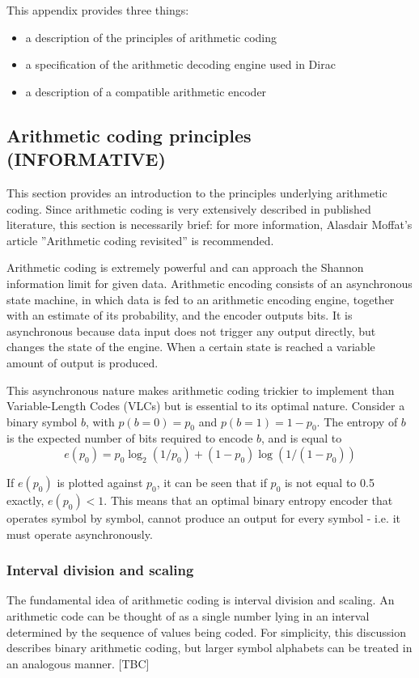 This appendix provides three things:
\begin{itemize}
\item a description of the principles of arithmetic
coding
\item a specification of the arithmetic decoding
engine used in Dirac
\item a description of a compatible arithmetic encoder
\end{itemize}

\begin{informative*}
\subsection{Arithmetic coding principles (INFORMATIVE)}

This section provides an introduction to the principles underlying arithmetic
coding. Since arithmetic coding is very extensively described in published literature,
this section is necessarily brief: for more information, Alasdair Moffat's
article ''Arithmetic coding revisited'' is recommended. 

Arithmetic coding is extremely powerful and can approach the Shannon information 
limit for given data. Arithmetic encoding consists of an asynchronous state machine, 
in which data
is fed to an arithmetic encoding engine, together with an estimate of its
probability, and the encoder outputs bits. It is asynchronous because data
input does not trigger any output directly, but changes the state of the 
engine. When a certain state is reached a variable amount of output is produced.

This asynchronous nature makes arithmetic coding trickier to implement 
than Variable-Length Codes (VLCs) but is essential to its optimal nature. Consider
a binary symbol $b$, with $p(b=0)=p_0$ and $p(b=1)=1-p_0$. The entropy of $b$
is the expected number of bits required to encode $b$, and is equal to
\[e(p_0)=p_0\log_2(1/p_0)+(1-p_0)\log(1/(1-p_0))\]

If $e(p_0)$ is plotted against $p_0$, it can be seen that if $p_0$ is not equal
to 0.5 exactly, $e(p_0)<1$. This means that an optimal binary entropy encoder
that operates symbol by symbol, cannot produce an output for every symbol - i.e.
it must operate asynchronously.

\subsubsection{Interval division and scaling}
The fundamental idea of arithmetic coding is interval division and scaling. An
arithmetic code can be thought of as a single number lying in an interval 
determined by the sequence of values being coded. For simplicity, this discussion
describes binary arithmetic coding, but larger symbol alphabets can be treated
in an analogous manner.
[TBC]


\end{informative*}
